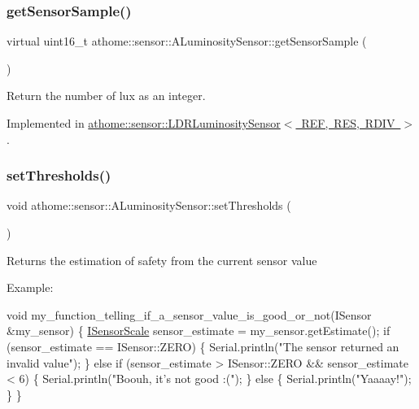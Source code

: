 \subsubsection{\texorpdfstring{get\+Sensor\+Sample()}{getSensorSample()}}
{\footnotesize\ttfamily virtual uint16\+\_\+t athome\+::sensor\+::\+A\+Luminosity\+Sensor\+::get\+Sensor\+Sample (\begin{DoxyParamCaption}{ }\end{DoxyParamCaption})\hspace{0.3cm}{\ttfamily [pure virtual]}}

Return the number of lux as an integer. 

Implemented in \mbox{\hyperlink{classathome_1_1sensor_1_1_l_d_r_luminosity_sensor_a6e4f25000704564ce30a7e3531f23c43}{athome\+::sensor\+::\+L\+D\+R\+Luminosity\+Sensor$<$ R\+E\+F, R\+E\+S, R\+D\+I\+V $>$}}.

\mbox{\label{classathome_1_1sensor_1_1_a_luminosity_sensor_aa26ed7176ba600f6900bd249edce71ab}} 
\subsubsection{\texorpdfstring{set\+Thresholds()}{setThresholds()}}
{\footnotesize\ttfamily void athome\+::sensor\+::\+A\+Luminosity\+Sensor\+::set\+Thresholds (\begin{DoxyParamCaption}\item[{const \mbox{\hyperlink{structathome_1_1sensor_1_1_i_sensor_1_1_i_sensor_thresholds}{I\+Sensor\+Thresholds}} \&}]{ }\end{DoxyParamCaption})\hspace{0.3cm}{\ttfamily [virtual]}}

Returns the estimation of safety from the current sensor value

Example\+:


\begin{DoxyCode}
\textcolor{keywordtype}{void} my\_function\_telling\_if\_a\_sensor\_value\_is\_good\_or\_not(ISensor &my\_sensor) \{
  \mbox{\hyperlink{classathome_1_1sensor_1_1_i_sensor_aa70bc27a4c17c86caf96cca776541ddf}{ISensorScale}} sensor\_estimate = my\_sensor.getEstimate();
  \textcolor{keywordflow}{if} (sensor\_estimate == ISensor::ZERO) \{
    Serial.println(\textcolor{stringliteral}{"The sensor returned an invalid value"});
  \}
  \textcolor{keywordflow}{else} \textcolor{keywordflow}{if} (sensor\_estimate > ISensor::ZERO && sensor\_estimate < 6) \{
    Serial.println(\textcolor{stringliteral}{"Boouh, it's not good :("});
  \}
  \textcolor{keywordflow}{else} \{
    Serial.println(\textcolor{stringliteral}{"Yaaaay!"});
  \}
\}
\end{DoxyCode}
 

